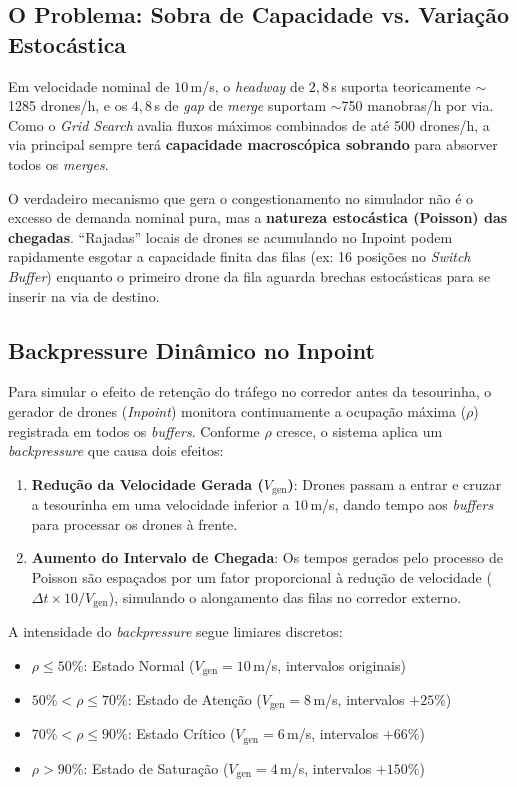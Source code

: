 \documentclass[12pt,a4paper]{article}
\begin{document}
\subsection{O Problema: Sobra de Capacidade vs. Variação Estocástica}

Em velocidade nominal de $10$\,m/s, o \textit{headway} de $2{,}8$\,s suporta teoricamente $\sim$1285 drones/h, e os $4{,}8$\,s de \textit{gap} de \textit{merge} suportam $\sim$750 manobras/h por via. Como o \textit{Grid Search} avalia fluxos máximos combinados de até 500 drones/h, a via principal sempre terá \textbf{capacidade macroscópica sobrando} para absorver todos os \textit{merges}. 

O verdadeiro mecanismo que gera o congestionamento no simulador não é o excesso de demanda nominal pura, mas a \textbf{natureza estocástica (Poisson) das chegadas}. ``Rajadas'' locais de drones se acumulando no Inpoint podem rapidamente esgotar a capacidade finita das filas (ex: 16 posições no \textit{Switch Buffer}) enquanto o primeiro drone da fila aguarda brechas estocásticas para se inserir na via de destino.

\subsection{Backpressure Dinâmico no Inpoint}

Para simular o efeito de retenção do tráfego no corredor antes da tesourinha, o gerador de drones (\textit{Inpoint}) monitora continuamente a ocupação máxima ($\rho$) registrada em todos os \textit{buffers}. Conforme $\rho$ cresce, o sistema aplica um \textit{backpressure} que causa dois efeitos:

\begin{enumerate}
    \item \textbf{Redução da Velocidade Gerada ($V_{\text{gen}}$)}: Drones passam a entrar e cruzar a tesourinha em uma velocidade inferior a $10$\,m/s, dando tempo aos \textit{buffers} para processar os drones à frente.
    \item \textbf{Aumento do Intervalo de Chegada}: Os tempos gerados pelo processo de Poisson são espaçados por um fator proporcional à redução de velocidade ($\Delta t \times 10/V_{\text{gen}}$), simulando o alongamento das filas no corredor externo.
\end{enumerate}

A intensidade do \textit{backpressure} segue limiares discretos:
\begin{itemize}
    \item $\rho \le 50\%$: Estado Normal ($V_{\text{gen}} = 10$\,m/s, intervalos originais)
    \item $50\% < \rho \le 70\%$: Estado de Atenção ($V_{\text{gen}} = 8$\,m/s, intervalos $+25\%$)
    \item $70\% < \rho \le 90\%$: Estado Crítico ($V_{\text{gen}} = 6$\,m/s, intervalos $+66\%$)
    \item $\rho > 90\%$: Estado de Saturação ($V_{\text{gen}} = 4$\,m/s, intervalos $+150\%$)
\end{itemize}
\end{document}

